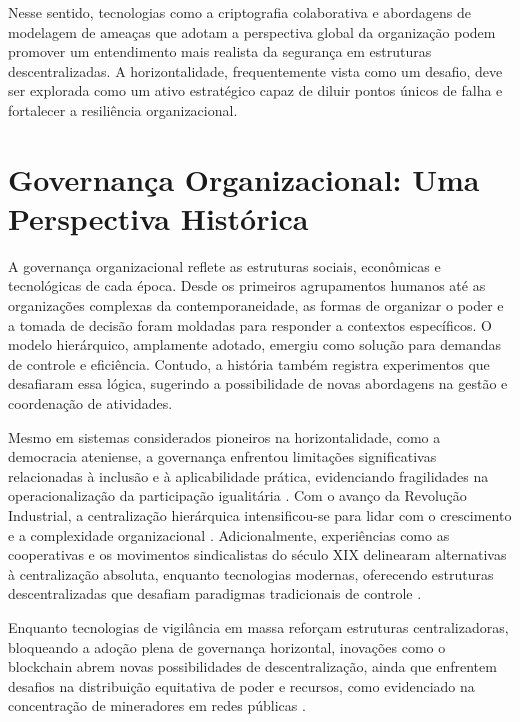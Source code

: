 Nesse sentido, tecnologias como a criptografia colaborativa \cite{Colbac,
AbcCrypto} e abordagens de modelagem de ameaças que adotam a perspectiva global
da organização podem promover um entendimento mais realista da segurança em
estruturas descentralizadas. A horizontalidade, frequentemente vista como
um desafio, deve ser explorada como um ativo estratégico capaz de diluir
pontos únicos de falha e fortalecer a resiliência organizacional.

\section{Governança Organizacional: Uma Perspectiva Histórica}
\label{sec:contexto_historico}

A governança organizacional reflete as estruturas sociais, econômicas e
tecnológicas de cada época. Desde os primeiros agrupamentos humanos até as
organizações complexas da contemporaneidade, as formas de organizar o poder
e a tomada de decisão foram moldadas para responder a contextos
específicos. O modelo hierárquico, amplamente adotado, emergiu como solução
para demandas de controle e eficiência. Contudo, a história também registra
experimentos que desafiaram essa lógica, sugerindo a possibilidade de novas
abordagens na gestão e coordenação de atividades.

Mesmo em sistemas considerados pioneiros na horizontalidade, como a
democracia ateniense, a governança enfrentou limitações significativas
relacionadas à inclusão e à aplicabilidade prática, evidenciando
fragilidades na operacionalização da participação igualitária
\cite{AthenianDemocracyABrief}. Com o avanço da Revolução Industrial, a
centralização hierárquica intensificou-se para lidar com o crescimento e a
complexidade organizacional \cite{WorkerCooperativesandRevolution}.
Adicionalmente, experiências como as cooperativas e os movimentos
sindicalistas do século XIX delinearam alternativas à centralização absoluta,
enquanto tecnologias modernas, oferecendo estruturas descentralizadas que desafiam paradigmas
tradicionais de controle \cite{WorkerCooperativesinAmerica, EverydayRevolutions}.

Enquanto tecnologias de vigilância em massa reforçam estruturas
centralizadoras, bloqueando a adoção plena de governança horizontal,
inovações como o blockchain abrem novas possibilidades de descentralização,
ainda que enfrentem desafios na distribuição equitativa de poder e
recursos, como evidenciado na concentração de mineradores em redes públicas
\cite{DoArtifactsHavePolitics}.

